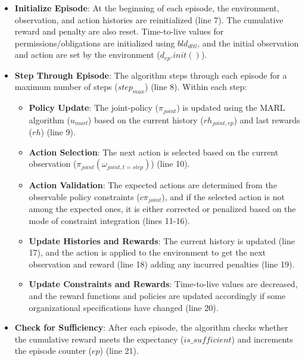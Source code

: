 \documentclass[sigconf,anonymous]{aamas}
\begin{document}
\begin{itemize}
  \item \textbf{Initialize Episode}:
        At the beginning of each episode, the environment, observation, and action histories are reinitialized (line 7). The cumulative reward and penalty are also reset. Time-to-live values for permissions/obligations are initialized using $bld_{dttl}$, and the initial observation and action are set by the environment ($d_{ep}.init()$).

  \item \textbf{Step Through Episode}:
        The algorithm steps through each episode for a maximum number of steps ($step_{max}$) (line 8). Within each step:

        \begin{itemize}
          \item \textbf{Policy Update}:
                The joint-policy ($\pi_{joint}$) is updated using the MARL algorithm ($u_{marl}$) based on the current history ($rh_{joint,ep}$) and last rewards ($rh$) (line 9).

          \item \textbf{Action Selection}:
                The next action is selected based on the current observation ($\pi_{joint}(\omega_{joint,t=step})$) (line 10).

          \item \textbf{Action Validation}:
                The expected actions are determined from the observable policy constraints ($c\pi_{joint}$), and if the selected action is not among the expected ones, it is either corrected or penalized based on the mode of constraint integration (lines 11-16).

          \item \textbf{Update Histories and Rewards}:
                The current history is updated (line 17), and the action is applied to the environment to get the next observation and reward (line 18) adding any incurred penalties (line 19).

          \item \textbf{Update Constraints and Rewards}:
                Time-to-live values are decreased, and the reward functions and policies are updated accordingly if some organizational specifications have changed (line 20).
        \end{itemize}

  \item \textbf{Check for Sufficiency}:
        After each episode, the algorithm checks whether the cumulative reward meets the expectancy ($is\_sufficient$) and increments the episode counter ($ep$) (line 21).
\end{itemize}
\end{document}
